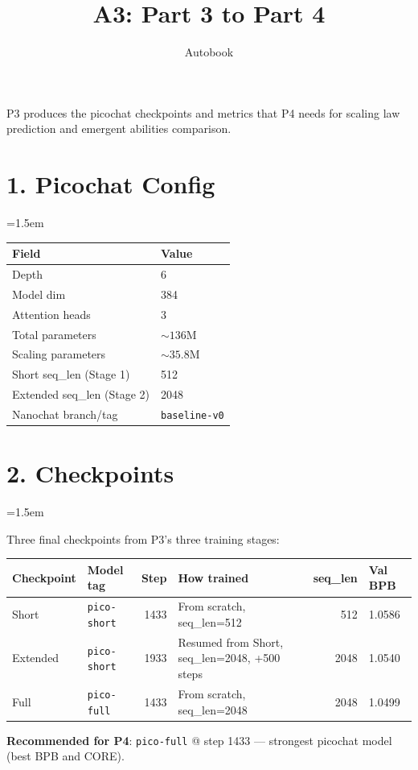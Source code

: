 \documentclass[9pt]{extarticle}
\title{\vspace{-1.2cm}\huge\textbf{A3: Part 3 to Part 4}\vspace{-0.5em}}
\author{\normalsize Autobook}
\date{\vspace{-1.5em}}
\begin{document}
\maketitle
\thispagestyle{fancy}

P3 produces the picochat checkpoints and metrics that P4 needs for scaling law prediction and emergent abilities comparison.

\leftskip=0pt
\section*{1. Picochat Config}
\leftskip=1.5em

\begin{tabular}{@{}ll@{}}
\toprule
Field & Value \\
\midrule
Depth & 6 \\
Model dim & 384 \\
Attention heads & 3 \\
Total parameters & ${\sim}136$M \\
Scaling parameters & ${\sim}35.8$M \\
Short seq\_len (Stage 1) & 512 \\
Extended seq\_len (Stage 2) & 2048 \\
Nanochat branch/tag & \texttt{baseline-v0} \\
\bottomrule
\end{tabular}

\leftskip=0pt
\section*{2. Checkpoints}
\leftskip=1.5em

Three final checkpoints from P3's three training stages:

\begin{tabular}{@{}llrlrl@{}}
\toprule
Checkpoint & Model tag & Step & How trained & seq\_len & Val BPB \\
\midrule
Short & \texttt{pico-short} & 1433 & From scratch, seq\_len=512 & 512 & 1.0586 \\
Extended & \texttt{pico-short} & 1933 & Resumed from Short, seq\_len=2048, +500 steps & 2048 & 1.0540 \\
Full & \texttt{pico-full} & 1433 & From scratch, seq\_len=2048 & 2048 & 1.0499 \\
\bottomrule
\end{tabular}

\medskip
\textbf{Recommended for P4}: \texttt{pico-full} @ step 1433 --- strongest picochat model (best BPB and CORE).
\end{document}
